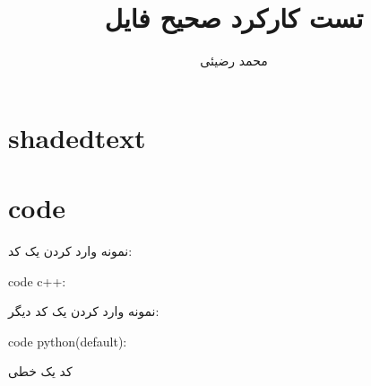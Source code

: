 \documentclass[12pt]{article}
\title{تست کارکرد صحیح فایل}
\author{محمد رضیئی}
\begin{document}
\maketitle

\section{shadedtext}
\ptext[1]
\begin{shadedtext}
	\ptext[1-10]
\end{shadedtext}
\ptext[1]

\section{code}
	نمونه وارد کردن یک کد:
\begin{latin}
\noindent code c++:

\end{latin}	


نمونه وارد کردن یک کد دیگر:
\begin{latin}
\noindent code python(default):

\end{latin}
کد یک خطی
\end{document}
